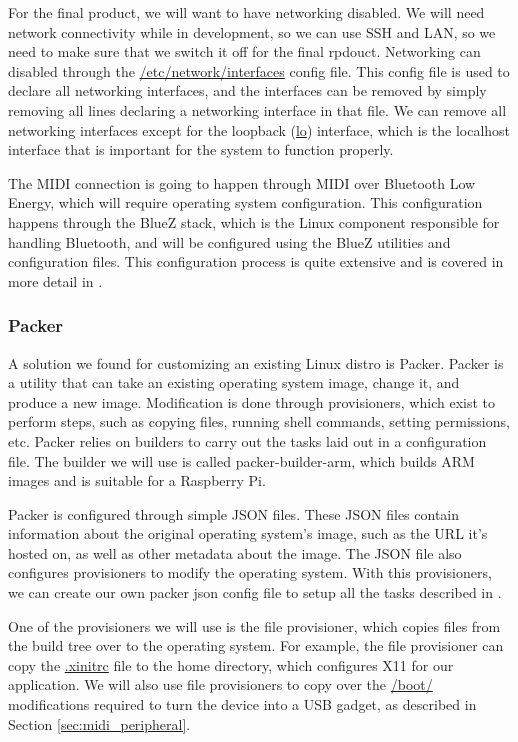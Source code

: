 For the final product, we will want to have networking disabled. We will need network
connectivity while in development, so we can use SSH and LAN, so we need to make sure that
we switch it off for the final rpdouct. Networking can disabled through the
\url{/etc/network/interfaces} config file. This config file is used to declare all
networking interfaces, and the interfaces can be removed by simply removing all lines
declaring a networking interface in that file. We can remove all networking interfaces
except for the loopback (\url{lo}) interface, which is the localhost interface that is
important for the system to function properly.

The MIDI connection is going to happen through MIDI over Bluetooth Low Energy, which will
require operating system configuration. This configuration happens through the BlueZ
stack, which is the Linux component responsible for handling Bluetooth, and will be
configured using the BlueZ utilities and configuration files. This configuration process
is quite extensive and is covered in more detail in .

\subsubsection{Packer}
\label{sec:packer}

A solution we found for customizing an existing Linux distro is Packer. Packer is a
utility that can take an existing operating system image, change it, and produce a new
image. Modification is done through provisioners, which exist to perform steps, such as
copying files, running shell commands, setting permissions, etc. Packer relies on builders
to carry out the tasks laid out in a configuration file. The builder we will use is called
packer-builder-arm, which builds ARM images and is suitable for a Raspberry Pi.

Packer is configured through simple JSON files. These JSON files contain information about
the original operating system's image, such as the URL it's hosted on, as well as other
metadata about the image. The JSON file also configures provisioners to modify the
operating system. With this provisioners, we can create our own packer json config file to
setup all the tasks described in .

One of the provisioners we will use is the file provisioner, which copies files from the
build tree over to the operating system. For example, the file provisioner can copy the
\url{.xinitrc} file to the home directory, which configures X11 for our application.
We will also use file provisioners to copy over the \url{/boot/} modifications required to
turn the device into a USB gadget, as described in Section \ref{sec:midi_peripheral}.

